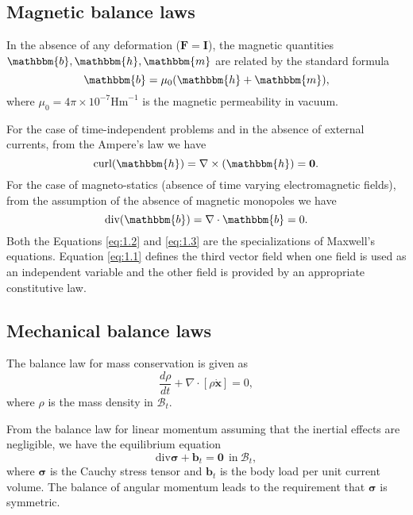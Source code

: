 \subsection{Magnetic balance laws}
In the absence of any deformation ($\mathbf{F} = \mathbf{I}$), the magnetic quantities $\mathbbm{b}, \mathbbm{h}, \mathbbm{m}$ are related by the standard formula
\begin{equation}
\mathbbm{b} = \mu_0 (\mathbbm{h} + \mathbbm{m}),
\label{eq:1.1}
\end{equation}
where $\mu_0 = 4\pi \times 10^{-7} \text{Hm}^{-1}$ is the magnetic permeability in vacuum. \par 
For the case of time-independent problems and in the absence of external currents, from the Ampere's law we have \cite{KANKANALA} 
\begin{equation}
\text{curl} (\mathbbm{h}) = \nabla \times (\mathbbm{h}) = \mathbf{0}.
\label{eq:1.2}
\end{equation}
For the case of magneto-statics (absence of time varying electromagnetic fields), from the assumption of the absence of magnetic monopoles we have \cite{KANKANALA}\begin{equation}
\text{div}(\mathbbm{b}) = \nabla \cdot \mathbbm{b} = 0.
\label{eq:1.3}
\end{equation}
Both the Equations \eqref{eq:1.2} and \eqref{eq:1.3} are the specializations of Maxwell's equations. Equation \eqref{eq:1.1} defines the third vector field when one field is used as an independent variable and the other field is provided by an appropriate constitutive law. 

\subsection{Mechanical balance laws}
The balance law for mass conservation is given as 
\begin{equation}
\frac{d\rho}{dt} + \nabla \cdot [\rho \mathbf{\dot{x}}] = 0,
\end{equation}
where $\rho$ is the mass density in $\mathcal{B}_t$. \par 
From the balance law for linear momentum assuming that the inertial effects are negligible, we have the equilibrium equation 
\begin{equation}
\text{div} \bm{\sigma} + \bm{b}_t = \mathbf{0} \ \ \text{in} \ \mathcal{B}_t,
\end{equation}
where $\bm{\sigma}$ is the Cauchy stress tensor and $\bm{b}_t$ is the body load per unit current volume. The balance of angular momentum leads to the requirement that $\bm{\sigma}$ is symmetric. 

